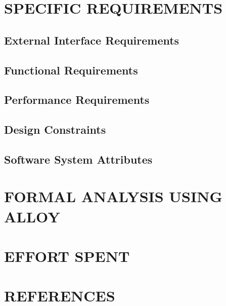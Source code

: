\documentclass[11pt]{report}
\begin{document}
	\chapter{SPECIFIC REQUIREMENTS}
	\label{ch:SPECIFIC REQUIREMENTS}
	
		\section{External Interface Requirements}
		\label{sect:External Interface Requirements}
			
			
		\section{Functional Requirements}
		\label{sect:Functional Requirements}
			
			
		\section{Performance Requirements}
		\label{sect:Performance Requirements}
			
			
		\section{Design Constraints}
		\label{sect:Design Constraints}
			
			
		\section{Software System Attributes}
		\label{sect:Software System Attributes}
			
			
	\chapter{FORMAL ANALYSIS USING ALLOY}
	\label{ch:FORMAL ANALYSIS USING ALLOY}
		
		
	\chapter{EFFORT SPENT}
	\label{ch:EFFORT SPENT}
		
	\chapter{REFERENCES}
	\label{ch:REFERENCES}
\end{document}
